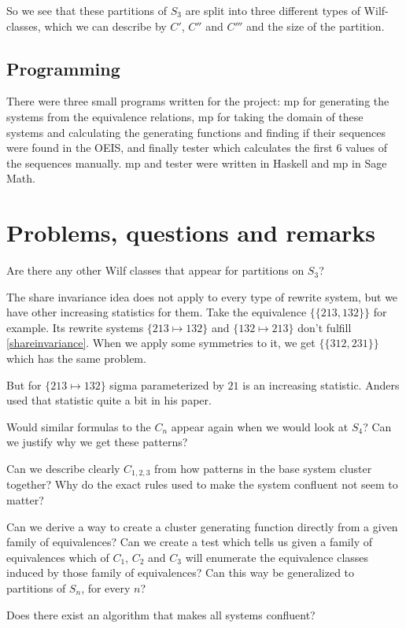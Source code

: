\documentclass[openany, a4paper, 11pt, english]{article}
\newcommand{\patternrule}{ \mapsto \!}
\theoremstyle{definition}
\newcommand{\Sym}{S}
\begin{document}
So we see that these partitions of $\Sym_3$ are split into three different types
of Wilf-classes, which we can describe by $C'$, $C''$ and $C'''$ and the size
of the partition.

\subsection{Programming}
There were three small programs written for the project: mp for generating the
systems from the equivalence relations, mp for taking the domain of these
systems and calculating the generating functions and finding if their sequences
were found in the OEIS, and finally tester which calculates the first 6 values
of the sequences manually. mp and tester were written in Haskell and mp in Sage Math. 


\section{Problems, questions and remarks}

Are there any other Wilf classes that appear for partitions on $\Sym_3$?

The share invariance idea does not apply to every type of rewrite system, but we
have other increasing statistics for them. Take the equivalence $\{ \{ 213, 132
\} \}$ for example. Its rewrite systems ${\{ 213 \patternrule 132 \}}$ and ${\{
132 \patternrule 213 \}}$ don't fulfill \eqref{shareinvariance}. When we
apply some symmetries to it, we get $\{ \{ 312, 231 \} \}$ which has the same
problem.

But for $\{ 213 \patternrule 132 \}$ sigma parameterized by $21$ is an
increasing statistic. Anders used that statistic quite a bit in his paper.

Would similar formulas to the $C_n$ appear again when we would
look at $\Sym_4$? Can we justify why we get these patterns?

Can we describe clearly $C_{1,2,3}$ from how patterns in the base system cluster together?
Why do the exact rules used to make the system confluent not seem to matter?

Can we derive a way to create a cluster generating function directly from a
given family of equivalences? Can we create a test which tells us given a family
of equivalences which of $C_1$, $C_2$ and $C_3$ will enumerate the equivalence
classes induced by those family of equivalences?
Can this way be generalized to partitions of $\Sym_n$, for every $n$?

Does there exist an algorithm that makes all systems confluent?
\end{document}
